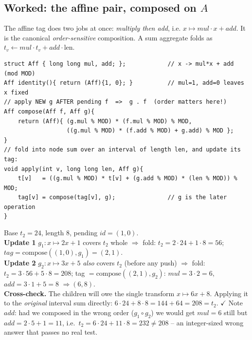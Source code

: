 \subsection{Worked: the affine pair, composed on \(A\)}

The affine tag does two jobs at once: \emph{multiply then add}, i.e. \(x\mapsto \mathit{mul}\cdot x+\mathit{add}\).  It is the canonical \emph{order-sensitive} composition.  A sum aggregate folds as \(t_v\leftarrow \mathit{mul}\cdot t_v+\mathit{add}\cdot\text{len}\).

\begin{lstlisting}[caption={affine lazy tag: two pending scalars, composed newest-on-outside}, label={lst:c15-affine}]
struct Aff { long long mul, add; };            // x -> mul*x + add   (mod MOD)
Aff identity(){ return (Aff){1, 0}; }          // mul=1, add=0 leaves x fixed
// apply NEW g AFTER pending f  =>  g . f  (order matters here!)
Aff compose(Aff f, Aff g){
    return (Aff){ (g.mul % MOD) * (f.mul % MOD) % MOD,
                  ((g.mul % MOD) * (f.add % MOD) + g.add) % MOD };
}
// fold into node sum over an interval of length len, and update its tag:
void apply(int v, long long len, Aff g){
    t[v]   = ((g.mul % MOD) * t[v] + (g.add % MOD) * (len % MOD)) % MOD;
    tag[v] = compose(tag[v], g);               // g is the later operation
}
\end{lstlisting}

\begin{tracebox}
Base \(t_2=24\), length \(8\), pending \(\mathit{id}=(1,0)\).\\
\textbf{Update 1} \(g_1: x\mapsto 2x+1\) covers \(t_2\) whole \(\Rightarrow\) fold: \(t_2=2\cdot24+1\cdot8=56\); \(\mathit{tag}=\text{compose}((1,0),g_1)=(2,1)\).\\
\textbf{Update 2} \(g_2: x\mapsto 3x+5\) \emph{also} covers \(t_2\) (before any push) \(\Rightarrow\) fold: \(t_2=3\cdot56+5\cdot8=208\); tag \(=\text{compose}((2,1),g_2)\): \(\mathit{mul}=3\cdot2=6\), \(\mathit{add}=3\cdot1+5=8\) \(\Rightarrow(6,8)\).\\
\textbf{Cross-check.} The children will owe the single transform \(x\mapsto6x+8\). Applying it to the \emph{original} interval sum directly: \(6\cdot24+8\cdot8=144+64=208=t_2\). \(\checkmark\)  Note \(\mathit{add}\): had we composed in the wrong order (\(g_1\circ g_2\)) we would get \(\mathit{mul}=6\) still but \(\mathit{add}=2\cdot5+1=11\), i.e.\ \(t_2=6\cdot24+11\cdot8=232\neq208\) -- an integer-sized wrong answer that passes no real test.
\end{tracebox}

